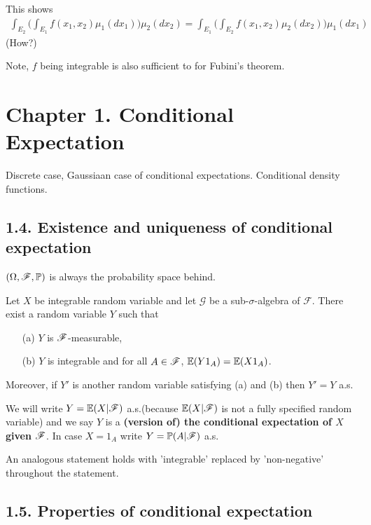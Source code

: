 \documentclass[10pt,a4paper]{report}
\begin{document}
This shows
\begin{align*}
\int_{E_2} \big( \int_{E_1} f(x_1, x_2) \mu_1(dx_1) \big) \mu_2(dx_2) = \int_{E_1} \big( \int_{E_2} f(x_1, x_2) \mu_2(dx_2) \big) \mu_1(dx_1)
\end{align*}
(How?)
\s

Note, $f$ being integrable is also sufficient to for Fubini's theorem.
\s

\section*{Chapter 1. Conditional Expectation}

Discrete case, Gaussiaan case of conditional expectations. Conditional density functions.

\subsection*{1.4. Existence and uniqueness of conditional expectation}

$(\Omega, \mathscr{F},\mathbb{P})$ is always the probability space behind.
\s

 Let $X$ be integrable random variable and let $\mathscr{G}$ be a sub-$\sigma$-algebra of $\mathscr{F}$. There exist a random variable $Y$ such that
\begin{itemize}
\item[(a)] $Y$ is $\mathscr{F}$-measurable,
\item[(b)] $Y$ is integrable and for all $A \in \mathscr{F}$, $\mathbb{E}(Y1_A) = \mathbb{E}(X1_A)$.
\end{itemize}
Moreover, if $Y'$ is another random variable satisfying (a) and (b) then $Y'=Y$ a.s.
\s

We will write $Y = \mathbb{E}(X | \mathscr{F})$ a.s.(because $\mathbb{E}(X|\mathscr{F})$ is not a fully specified random variable) and we say $Y$ is a \textbf{(version of) the conditional expectation of $X$ given $\mathscr{F}$}. In case $X = 1_A$ write $Y=\mathbb{P}(A|\mathscr{F})$ a.s.
\s

An analogous statement holds with 'integrable' replaced by 'non-negative' throughout the statement.

\subsection*{1.5. Properties of conditional expectation}
\end{document}
